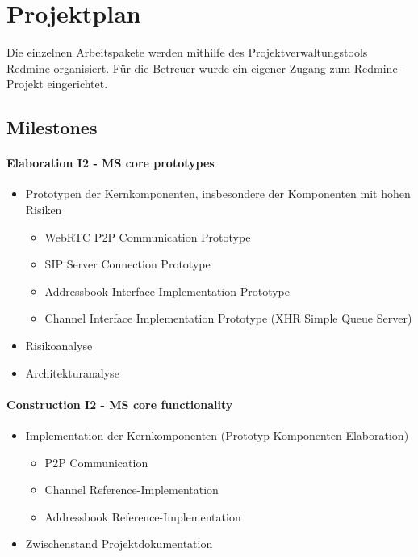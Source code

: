 \chapter{Projektplan}
Die einzelnen Arbeitspakete werden mithilfe des Projektverwaltungstools Redmine
organisiert. Für die Betreuer wurde ein eigener Zugang zum Redmine-Projekt eingerichtet.


	\section{Milestones}
		\subsubsection{Elaboration I2 - MS core prototypes}
			\begin{itemize}
				\item Prototypen der Kernkomponenten, insbesondere der Komponenten mit hohen Risiken
					\begin{itemize}
						\item WebRTC P2P Communication Prototype
						\item SIP Server Connection Prototype
						\item Addressbook Interface Implementation Prototype
						\item Channel Interface Implementation Prototype (XHR Simple Queue Server)
					\end{itemize}
				\item Risikoanalyse
				\item Architekturanalyse
			\end{itemize}
			
		\subsubsection{Construction I2 - MS core functionality}
			\begin{itemize}
				\item Implementation der Kernkomponenten (Prototyp-Komponenten-Elaboration)
					\begin{itemize}
						\item P2P Communication
						\item Channel Reference-Implementation
						\item Addressbook Reference-Implementation
					\end{itemize}
				\item Zwischenstand Projektdokumentation
			\end{itemize}
			
